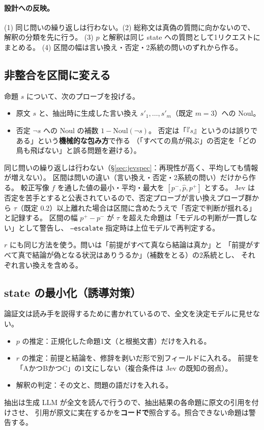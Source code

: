 \documentclass[a4paper,11pt]{ltjsarticle}
\begin{document}
\paragraph{設計への反映。}
(1) 同じ問いの繰り返しは行わない。(2) 総称文は真偽の質問に向かないので、解釈の分類を先に行う。
(3) $p$ と解釈は同じ state への質問として1リクエストにまとめる。
(4) 区間の幅は言い換え・否定・2系統の問いのずれから作る。

\subsection{非整合を区間に変える}

命題 $s$ について、次のプローブを投げる。
\begin{itemize}
  \item 原文 $s$ と、抽出時に生成した言い換え $s'_1,\dots,s'_m$（既定 $m=3$）への Noul。
  \item 否定 $\neg s$ への Noul の補数 $1-\mathrm{Noul}(\neg s)$。
        否定は「『$s$』というのは誤りである」という\textbf{機械的な包み方}で作る
        （「すべての鳥が飛ぶ」の否定を「どの鳥も飛ばない」と誤る問題を避ける）。
\end{itemize}
同じ問いの繰り返しは行わない（§\ref{sec:jevspec}：再現性が高く、平均しても情報が増えない）。
区間は問いの違い（言い換え・否定・2系統の問い）だけから作る。
較正写像 $f$ を通した値の最小・平均・最大を $[p^-, \hat p, p^+]$ とする。
Jev は否定を苦手とすると公表されているので、否定プローブが言い換えプローブ群から
$\tau$（既定 0.2）以上離れた場合は区間に含めたうえで「否定で判断が揺れる」と記録する。
区間の幅 $p^+-p^-$ が $\tau$ を超えた命題は「モデルの判断が一貫しない」として警告し、
\texttt{--escalate} 指定時は上位モデルで再判定する。

$r$ にも同じ方法を使う。問いは「前提がすべて真なら結論は真か」と
「前提がすべて真で結論が偽となる状況はありうるか」（補数をとる）の2系統とし、
それぞれ言い換えを含める。

\subsection{state の最小化（誘導対策）}

論証文は読み手を説得するために書かれているので、全文を決定モデルに見せない。
\begin{itemize}
  \item $p$ の推定：正規化した命題1文（と根拠文書）だけを入れる。
  \item $r$ の推定：前提と結論を、修辞を剥いだ形で別フィールドに入れる。
        前提を「AかつBかつC」の1文にしない（複合条件は Jev の既知の弱点）。
  \item 解釈の判定：その文と、問題の語だけを入れる。
\end{itemize}
抽出は生成 LLM が全文を読んで行うので、抽出結果の各命題に原文の引用を付けさせ、
引用が原文に実在するかを\textbf{コードで}照合する。照合できない命題は警告する。
\end{document}
